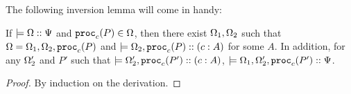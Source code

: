 The following inversion lemma will come in handy:
\begin{lemma}
  \label{inversion-configuration}
  If $\models {\Omega} :: {\Psi}$ and $\mathtt{proc}_{c}(P) \in \Omega$, then there exist $\Omega_1, \Omega_2$ such that $\Omega = \Omega_1, \Omega_2, \mathtt{proc}_{c}(P)$ and $\models {\Omega_2, \mathtt{proc}_{c}(P)} :: ({c} : {A})$ for some $A$. In addition, for any $\Omega_2'$ and $P'$ such that $\models {\Omega_2', \mathtt{proc}_{c}(P')} :: ({c} : {A})$, $\models {\Omega_1, \Omega_2', \mathtt{proc}_{c}(P')} :: {\Psi}$.
\end{lemma}
\begin{proof}
  By induction on the derivation. 
\end{proof}

